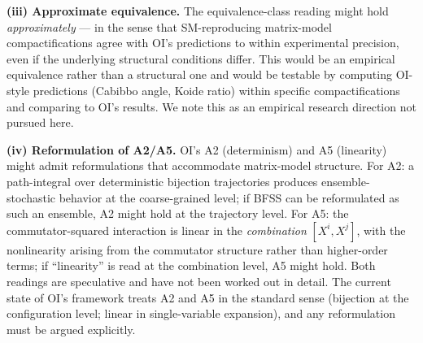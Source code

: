 \documentclass[
]{article}
\begin{document}
\textbf{(iii) Approximate equivalence.} The equivalence-class reading
might hold \emph{approximately} --- in the sense that SM-reproducing
matrix-model compactifications agree with OI's predictions to within
experimental precision, even if the underlying structural conditions
differ. This would be an empirical equivalence rather than a structural
one and would be testable by computing OI-style predictions (Cabibbo
angle, Koide ratio) within specific compactifications and comparing to
OI's results. We note this as an empirical research direction not
pursued here.

\textbf{(iv) Reformulation of A2/A5.} OI's A2 (determinism) and A5
(linearity) might admit reformulations that accommodate matrix-model
structure. For A2: a path-integral over deterministic bijection
trajectories produces ensemble-stochastic behavior at the coarse-grained
level; if BFSS can be reformulated as such an ensemble, A2 might hold at
the trajectory level. For A5: the commutator-squared interaction is
linear in the \emph{combination} \([X^i, X^j]\), with the nonlinearity
arising from the commutator structure rather than higher-order terms; if
``linearity'' is read at the combination level, A5 might hold. Both
readings are speculative and have not been worked out in detail. The
current state of OI's framework treats A2 and A5 in the standard sense
(bijection at the configuration level; linear in single-variable
expansion), and any reformulation must be argued explicitly.
\end{document}
